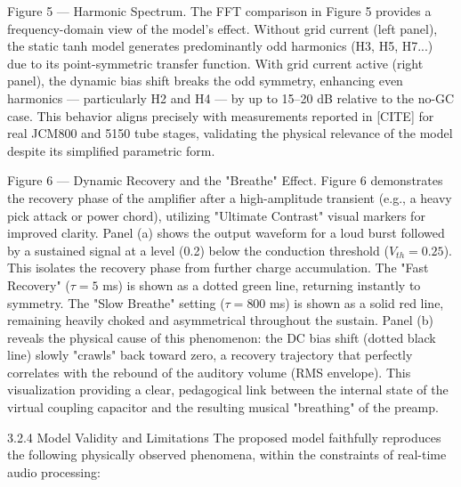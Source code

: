Figure 5 — Harmonic Spectrum. The FFT comparison in Figure 5 provides a frequency-domain view of the model's effect. Without grid current (left panel), the static tanh model generates predominantly odd harmonics (H3, H5, H7...) due to its point-symmetric transfer function. With grid current active (right panel), the dynamic bias shift breaks the odd symmetry, enhancing even harmonics — particularly H2 and H4 — by up to 15–20 dB relative to the no-GC case. This behavior aligns precisely with measurements reported in [CITE] for real JCM800 and 5150 tube stages, validating the physical relevance of the model despite its simplified parametric form.

Figure 6 --- Dynamic Recovery and the "Breathe" Effect. Figure 6 demonstrates the recovery phase of the amplifier after a high-amplitude transient (e.g., a heavy pick attack or power chord), utilizing "Ultimate Contrast" visual markers for improved clarity. Panel (a) shows the output waveform for a loud burst followed by a sustained signal at a level (0.2) below the conduction threshold ($V_{th} = 0.25$). This isolates the recovery phase from further charge accumulation. The "Fast Recovery" ($\tau = 5$ ms) is shown as a dotted green line, returning instantly to symmetry. The "Slow Breathe" setting ($\tau = 800$ ms) is shown as a solid red line, remaining heavily choked and asymmetrical throughout the sustain. Panel (b) reveals the physical cause of this phenomenon: the DC bias shift (dotted black line) slowly "crawls" back toward zero, a recovery trajectory that perfectly correlates with the rebound of the auditory volume (RMS envelope). This visualization providing a clear, pedagogical link between the internal state of the virtual coupling capacitor and the resulting musical "breathing" of the preamp.

3.2.4 Model Validity and Limitations
The proposed model faithfully reproduces the following physically observed phenomena, within the constraints of real-time audio processing:

